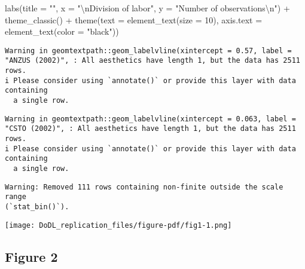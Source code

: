 \documentclass[
  12,
  letterpaper,
  DIV=11,
  numbers=noendperiod]{scrartcl}
\newenvironment{Shaded}{\begin{snugshade}}{\end{snugshade}}
\newcommand{\AttributeTok}[1]{\textcolor[rgb]{0.40,0.45,0.13}{#1}}
\newcommand{\DecValTok}[1]{\textcolor[rgb]{0.68,0.00,0.00}{#1}}
\newcommand{\FunctionTok}[1]{\textcolor[rgb]{0.28,0.35,0.67}{#1}}
\newcommand{\NormalTok}[1]{\textcolor[rgb]{0.00,0.23,0.31}{#1}}
\newcommand{\SpecialCharTok}[1]{\textcolor[rgb]{0.37,0.37,0.37}{#1}}
\newcommand{\StringTok}[1]{\textcolor[rgb]{0.13,0.47,0.30}{#1}}
\begin{document}
\begin{Shaded}
\begin{Highlighting}[numbers=left,,]
  \FunctionTok{labs}\NormalTok{(}\AttributeTok{title =} \StringTok{""}\NormalTok{,}
       \AttributeTok{x =} \StringTok{"}\SpecialCharTok{\textbackslash{}n}\StringTok{Division of labor"}\NormalTok{,}
       \AttributeTok{y =} \StringTok{"Number of observations}\SpecialCharTok{\textbackslash{}n}\StringTok{"}\NormalTok{) }\SpecialCharTok{+}
  \FunctionTok{theme\_classic}\NormalTok{() }\SpecialCharTok{+}
  \FunctionTok{theme}\NormalTok{(}\AttributeTok{text =} \FunctionTok{element\_text}\NormalTok{(}\AttributeTok{size =} \DecValTok{10}\NormalTok{),}
        \AttributeTok{axis.text =} \FunctionTok{element\_text}\NormalTok{(}\AttributeTok{color =} \StringTok{"black"}\NormalTok{))}
\end{Highlighting}
\end{Shaded}

\begin{verbatim}
Warning in geomtextpath::geom_labelvline(xintercept = 0.57, label = "ANZUS (2002)", : All aesthetics have length 1, but the data has 2511 rows.
i Please consider using `annotate()` or provide this layer with data containing
  a single row.
\end{verbatim}

\begin{verbatim}
Warning in geomtextpath::geom_labelvline(xintercept = 0.063, label = "CSTO (2002)", : All aesthetics have length 1, but the data has 2511 rows.
i Please consider using `annotate()` or provide this layer with data containing
  a single row.
\end{verbatim}

\begin{verbatim}
Warning: Removed 111 rows containing non-finite outside the scale range
(`stat_bin()`).
\end{verbatim}

\texttt{[image: DoDL\_replication\_files/figure-pdf/fig1-1.png]}

\newpage

\subsection{Figure 2}\label{figure-2}
\end{document}
